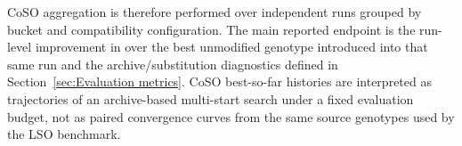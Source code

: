CoSO aggregation is therefore performed over independent runs grouped by bucket 
and compatibility configuration. 
The main reported endpoint is 
the run-level improvement in \vertpos{} over the best unmodified genotype introduced into that same run and the archive/substitution diagnostics defined in Section~\ref{sec:Evaluation metrics}. CoSO best-so-far histories are interpreted as trajectories of an archive-based multi-start search under a fixed evaluation budget, not as paired convergence curves from the same source genotypes used by the LSO benchmark.


